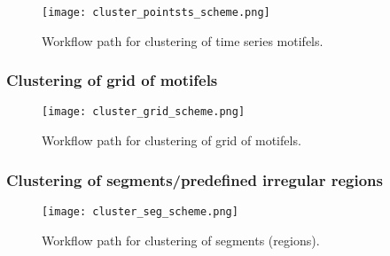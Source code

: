 \begin{figure}[H]
	\centering
	\texttt{[image: cluster\_pointsts\_scheme.png]}
	\caption{Workflow path for clustering of time series motifels.}
	\label{FIG:CLUSTER_POINTSTS}
\end{figure}

\FloatBarrier

\subsubsection{Clustering of grid of motifels}

\begin{figure}[H]
	\centering
	\texttt{[image: cluster\_grid\_scheme.png]}
	\caption{Workflow path for clustering of grid of motifels.}
	\label{FIG:CLUSTER_GRID}
\end{figure}

\FloatBarrier

\subsubsection{Clustering of segments/predefined irregular regions}

\begin{figure}[H]
	\centering
	\texttt{[image: cluster\_seg\_scheme.png]}
	\caption{Workflow path for clustering of segments (regions).}
	\label{FIG:CLUSTER_SEGMENT}
\end{figure}